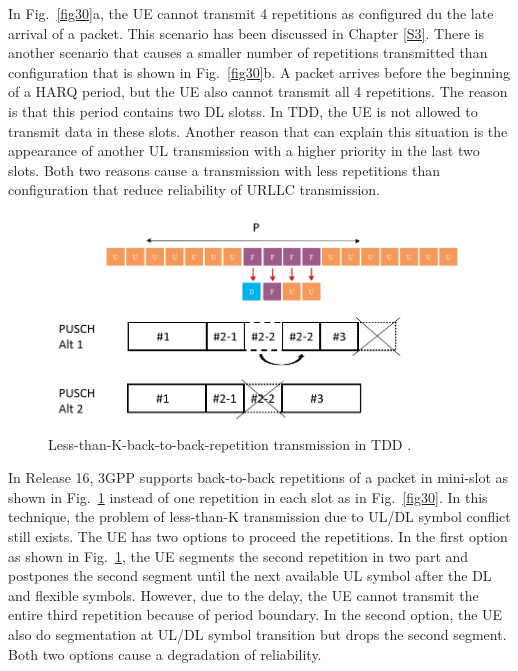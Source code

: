 \documentclass{report}
\begin{document}
In Fig.~\ref{fig30}a, the UE cannot transmit 4 repetitions as configured du the late arrival of a packet. This scenario has been discussed in Chapter \ref{S3}. There is another scenario that causes a smaller number of repetitions transmitted than configuration that is shown in Fig.~\ref{fig30}b. A packet arrives before the beginning of a HARQ period,  but the UE also cannot transmit all 4 repetitions. The reason is that this period contains two DL slotss. In TDD, the UE is not allowed to transmit data in these slots. Another reason that can explain this situation is the appearance of another UL transmission with a higher priority in the last two slots. Both two reasons cause a transmission with less repetitions than configuration that reduce reliability of URLLC transmission.

\begin{figure}[htbp]
\centerline{\includegraphics[scale=0.35]{fig31.png}}
\caption{Less-than-K-back-to-back-repetition transmission in TDD .}
\label{fig31}
\end{figure}

In Release 16, 3GPP supports back-to-back repetitions of a packet in mini-slot as shown in Fig.~\ref{fig31} instead of one repetition in each slot as in Fig.~\ref{fig30}. In this technique, the problem of less-than-K transmission due to UL/DL symbol conflict still exists. The UE has two options to proceed the repetitions. In the first option as shown in Fig.~\ref{fig31}, the UE segments the second repetition in two part and postpones the second segment until the next available UL symbol after the DL and flexible symbols. However, due to the delay, the UE cannot transmit the entire third repetition because of period boundary. In the second option, the UE also do segmentation at UL/DL symbol transition but drops the second segment. Both two options cause a degradation of reliability.
\end{document}
